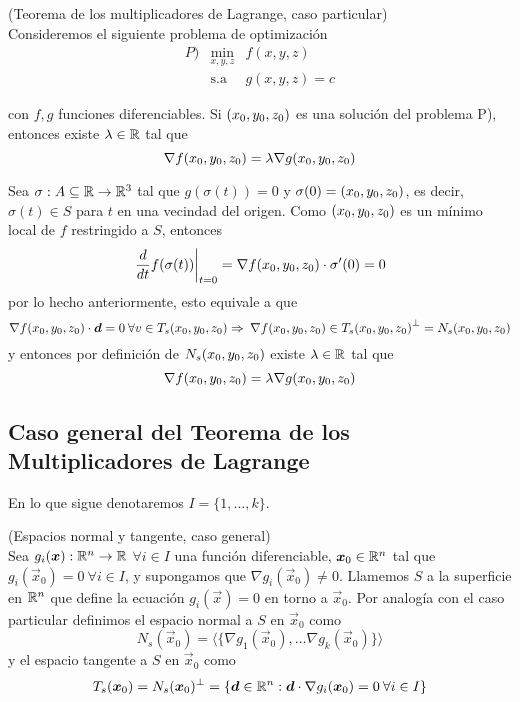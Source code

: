 \begin{teorema}{\rm (Teorema de los multiplicadores de Lagrange, caso particular)
}\label{mlagrange-1}
\\Consideremos el siguiente problema de
optimizaci\'on
\begin{equation*}
\begin{array}{lcl}
P)  & \displaystyle \min_{x,y,z} 	& f(x,y,z) \\
	& \text{s.a}					& g(x,y,z)=c
\end{array}
\end{equation*}

con $f,g$ funciones diferenciables. Si $\p0$ es una soluci\'on del
problema P), entonces existe $\lambda \in \mathbb{R}$ tal que
\[\nabla f{\p0}=\lambda\nabla g{\p0}\]
\end{teorema}

\begin{demostracion}
Sea $\sigma:A\subseteq\mathbb{R}\to \mathbb{R}^3$ tal que
$g(\sigma(t))=0$ y $\sigma(0)={\p0}$, es decir, $\sigma(t)\in S$
para $t$ en una vecindad del origen. Como $\p0$ es un m\'inimo local de $f$ restringido a $S$, entonces
\[\left.{\frac{d}{dt}f(\sigma(t))}\right|_{t=0}=\nabla f{\p0}\cdot \sigma^{\prime}(0)=0\]
por lo hecho anteriormente, esto equivale a que $$\nabla
f{\p0}\cdot \vec{d}=0\:\forall v\in T_s{\p0}\Rightarrow\:\nabla f{\p0}\in
T_s{\p0}^{\perp}=N_s{\p0}$$ 
y entonces por definici\'on de
$N_s{\p0}$ existe $\lambda\in\mathbb{R}$ tal que 
$$
\nabla
f{\p0}=\lambda\nabla g{\p0}
$$
\end{demostracion}

\subsection{Caso general del Teorema de los Multiplicadores de Lagrange}

\begin{nota}
En lo que sigue denotaremos $I=\{1,\ldots,k\}$.
\end{nota}

\begin{definicion}{\rm (Espacios normal y tangente, caso general)}\label{esp-normal}
\\Sea $g_i (\boldsymbol{x}):\mathbb{R}^n\to \mathbb{R}$ $\forall i\in I$ una funci\'on diferenciable, $\boldsymbol{x}_0 \in \mathbb{R}^n$ tal
que $g_i (\vec{x}_0) = 0 \:\forall i\in I$, y supongamos que $\nabla g_i (\vec{x}_0)\neq 0$. Llamemos $S$ a la superficie en $\mathbb{R}^n$ que define la ecuaci\'on $g_i (\vec{x}) = 0$ en torno a $\vec{x}_0$. Por analog\'ia con el caso particular
definimos el espacio normal a $S$ en $\vec{x}_0$ como
\[N_s(\vec{x}_0)=\langle\{\nabla g_1(\vec{x}_0),\ldots\nabla g_k(\vec{x}_0)\}\rangle\]
y el espacio tangente a $S$ en $\vec{x}_0$ como
\[T_s(\boldsymbol{x}_0)=N_s(\boldsymbol{x}_0)^{\perp}=\{\boldsymbol{d}\in \mathbb{R}^n : \boldsymbol{d}\cdot \nabla
g_i(\boldsymbol{x}_0)=0\: \forall i\in I\}\] 
\end{definicion}

